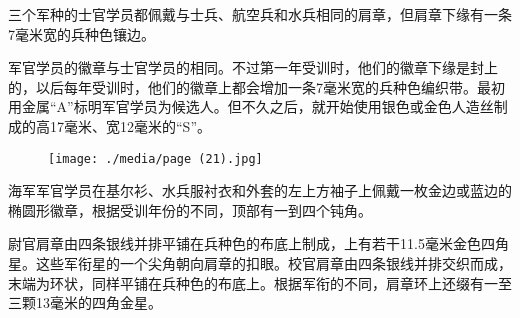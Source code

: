 三个军种的士官学员都佩戴与士兵、航空兵和水兵相同的肩章，但肩章下缘有一条7毫米宽的兵种色镶边。

军官学员的徽章与士官学员的相同。不过第一年受训时，他们的徽章下缘是封上的，以后每年受训时，他们的徽章上都会增加一条7毫米宽的兵种色编织带。最初用金属“A”标明军官学员为候选人。但不久之后，就开始使用银色或金色人造丝制成的高17毫米、宽12毫米的“S”。

\begin{figure}
\texttt{[image: ./media/page (21).jpg]}
\end{figure}

海军军官学员在基尔衫、水兵服衬衣和外套的左上方袖子上佩戴一枚金边或蓝边的椭圆形徽章，根据受训年份的不同，顶部有一到四个钝角。

尉官肩章由四条银线并排平铺在兵种色的布底上制成，上有若干11.5毫米金色四角星。这些军衔星的一个尖角朝向肩章的扣眼。校官肩章由四条银线并排交织而成，末端为环状，同样平铺在兵种色的布底上。根据军衔的不同，肩章环上还缀有一至三颗13毫米的四角金星。

